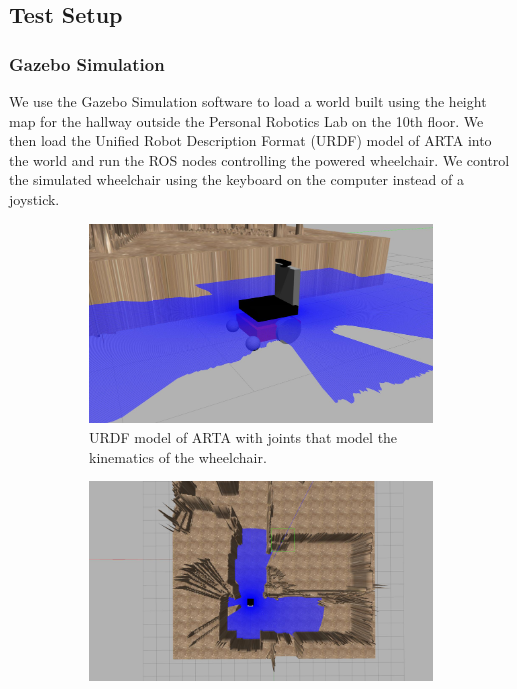 \subsection{Test Setup}

\subsubsection{Gazebo Simulation}
We use the Gazebo Simulation software to load a world built using the height map for the hallway outside the Personal Robotics Lab on the 10th floor. We then load the Unified Robot Description Format (URDF) model of ARTA into the world and run the ROS nodes controlling the powered wheelchair. We control the simulated wheelchair using the keyboard on the computer instead of a joystick.

\begin{figure}[ht]
	\begin{subfigure}[b]{.48\textwidth}
		\centering
		\includegraphics[width=1.0\linewidth]{img/chapter6_test/artamodel.jpg}
		\caption{URDF model of ARTA with joints that model the kinematics of the wheelchair.}
	\end{subfigure}%
	\hspace{\fill} 
	\begin{subfigure}[b]{.48\textwidth}
		\centering
		\includegraphics[width=1.0\linewidth]{img/chapter6_test/heightmap.jpg}

\end{subfigure}
\end{figure}
